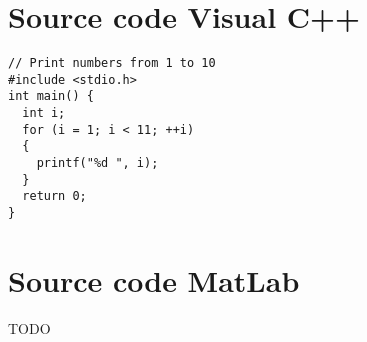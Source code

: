 

\section{Source code Visual C++}


\begin{lstlisting}[caption={[Demo] For loop to print numbers from 1 to 10}]
// Print numbers from 1 to 10
#include <stdio.h>
int main() {
  int i;
  for (i = 1; i < 11; ++i)
  {
    printf("%d ", i);
  }
  return 0;
}
\end{lstlisting}


\section{Source code MatLab}

\Large{TODO}
